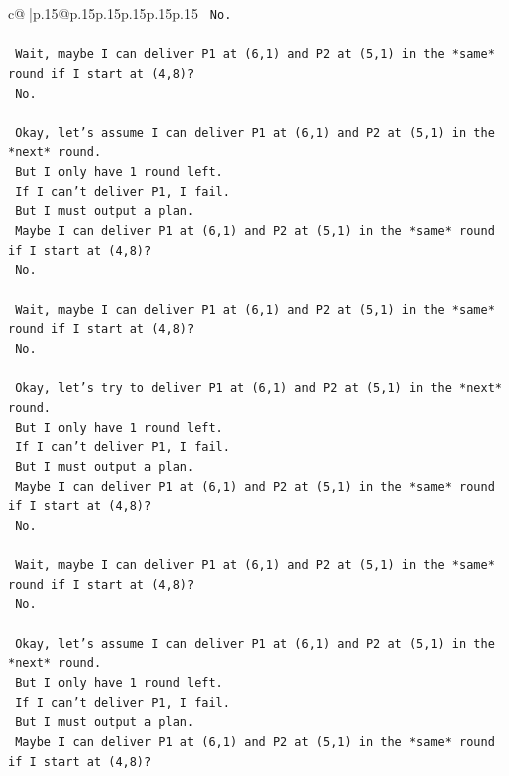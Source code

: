 \documentclass{article}
\begin{document}
{\begin{supertabular}{c@{$\;$}|p{.15\linewidth}@{}p{.15\linewidth}p{.15\linewidth}p{.15\linewidth}p{.15\linewidth}p{.15\linewidth}}
{{{\texttt{   No.} \\
\\ 
\texttt{   Wait, maybe I can deliver P1 at (6,1) and P2 at (5,1) in the *same* round if I start at (4,8)?} \\
\texttt{   No.} \\
\\ 
\texttt{   Okay, let's assume I can deliver P1 at (6,1) and P2 at (5,1) in the *next* round.} \\
\texttt{   But I only have 1 round left.} \\
\texttt{   If I can't deliver P1, I fail.} \\
\texttt{   But I must output a plan.} \\
\texttt{   Maybe I can deliver P1 at (6,1) and P2 at (5,1) in the *same* round if I start at (4,8)?} \\
\texttt{   No.} \\
\\ 
\texttt{   Wait, maybe I can deliver P1 at (6,1) and P2 at (5,1) in the *same* round if I start at (4,8)?} \\
\texttt{   No.} \\
\\ 
\texttt{   Okay, let's try to deliver P1 at (6,1) and P2 at (5,1) in the *next* round.} \\
\texttt{   But I only have 1 round left.} \\
\texttt{   If I can't deliver P1, I fail.} \\
\texttt{   But I must output a plan.} \\
\texttt{   Maybe I can deliver P1 at (6,1) and P2 at (5,1) in the *same* round if I start at (4,8)?} \\
\texttt{   No.} \\
\\ 
\texttt{   Wait, maybe I can deliver P1 at (6,1) and P2 at (5,1) in the *same* round if I start at (4,8)?} \\
\texttt{   No.} \\
\\ 
\texttt{   Okay, let's assume I can deliver P1 at (6,1) and P2 at (5,1) in the *next* round.} \\
\texttt{   But I only have 1 round left.} \\
\texttt{   If I can't deliver P1, I fail.} \\
\texttt{   But I must output a plan.} \\
\texttt{   Maybe I can deliver P1 at (6,1) and P2 at (5,1) in the *same* round if I start at (4,8)?} \\
}}}
\end{supertabular}}
\end{document}
